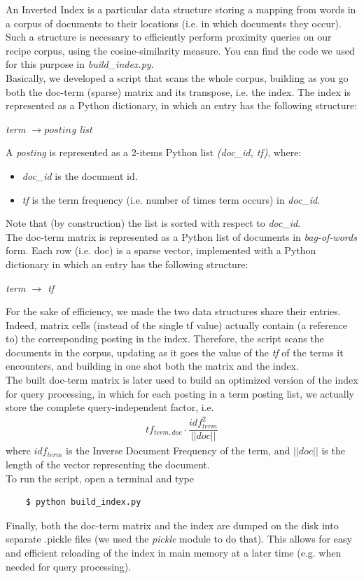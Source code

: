 An Inverted Index\cite{inv_ind} is a particular data structure storing a mapping from words in a corpus of documents to their locations (i.e. in which documents they occur). Such a structure is necessary to efficiently perform proximity queries on our recipe corpus, using the cosine-similarity measure. You can find the code we used for this purpose in \textit{build\_index.py}.\\
Basically, we developed a script that scans the whole corpus, building as you go both the doc-term (sparse) matrix\cite{doc_term} and its transpose, i.e. the index. The index is represented as a Python dictionary, in which an entry has the following structure:
\begin{center}
	\textit{term $\rightarrow postin$g list}
\end{center}
A \textit{posting} is represented as a 2-items Python list \textit{(doc\_id, tf)}, where:
\begin{itemize}
	\item \textit{doc\_id} is the document id.
	\item \textit{tf} is the term frequency (i.e. number of times term occurs) in \textit{doc\_id}.
\end{itemize}
Note that (by construction) the list is sorted with respect to \textit{doc\_id}.\\
The doc-term matrix is represented as a Python list of documents in \textit{bag-of-words} form. Each row (i.e. doc) is a sparse vector, implemented with a Python dictionary in which an entry has the following structure:
\begin{center}
	\textit{term $\rightarrow$ tf}
\end{center}
For the sake of efficiency, we made the two data structures share their entries. Indeed, matrix cells (instead of the single tf value) actually contain (a reference to) the corresponding posting in the index. Therefore, the script scans the documents in the corpus, updating as it goes the value of the \textit{tf} of the terms it encounters, and building in one shot both the matrix and the index.\\
The built doc-term matrix is later used to build an optimized version of the index for query processing, in which for each posting in a term posting list, we actually store the complete query-independent factor, i.e.
\begin{align*}
	tf_{term,doc} \cdot \dfrac{idf_{term}^2}{||doc||}
\end{align*}
where $idf_{term}$ is the Inverse Document Frequency\cite{tf_idf} of the term, and $||doc||$ is the length of the vector representing the document.\\
To run the script, open a terminal and type
\begin{lstlisting}
	$ python build_index.py
\end{lstlisting}
Finally, both the doc-term matrix and the index are dumped on the disk into separate .pickle files (we used the \textit{pickle}\cite{pickle} module to do that). This allows for easy and efficient reloading of the index in main memory at a later time (e.g. when needed for query processing).


